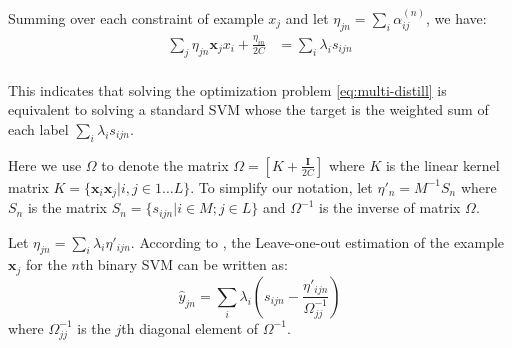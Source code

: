Summing over each constraint of example $x_j$ and let 
$\eta_{jn}=\sum_i\alpha^{(n)}_{ij}$, we have:
\begin{equation}
\begin{aligned}
\sum_j\eta_{jn}\textbf{x}_jx_i+\frac{\eta_{in}}{2C}&=\sum_i\lambda_is_{ijn}\\
\end{aligned}
\end{equation}

This indicates that solving the optimization problem \eqref{eq:multi-distill} is equivalent to solving a standard SVM whose the target is the weighted sum of each label $\sum_i\lambda_is_{ijn}$.

Here we use $\Omega$ to denote the matrix $\Omega=[K+\frac{\mathbf{I}}{2C}]$ where $K$ is the linear kernel matrix $K=\{\textbf{x}_i\textbf{x}_j|i,j\in 1\dots L\}$. To simplify our notation, let ${\eta}'_{n}=M^{-1}S_n$ where $S_n$ is the matrix $S_n=\{s_{ijn}|i\in M;j\in L\}$ and $\Omega^{-1}$ is the inverse of matrix $\Omega$. 

Let $\eta_{jn}=\sum_i\lambda_i{\eta}'_{ijn}$.
According to  \cite{cawley2006leave}, the Leave-one-out estimation of the example $\textbf{x}_j$ for the $n$th binary SVM can be written as:
\begin{equation}\label{eq:yhat}
\hat{y}_{jn} = \sum_i\lambda_i\left(s_{ijn}-\frac{{\eta}'_{ijn}}{\Omega_{jj}^{-1}}\right)
\end{equation}
where $\Omega^{-1}_{jj}$ is the $j$th diagonal element of $\Omega^{-1}$.
